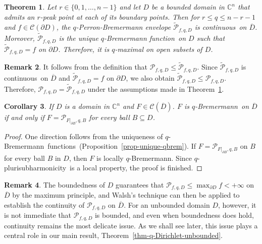 \documentclass[reqno]{amsart}
\newtheorem{thm}{Theorem}[section]
\newtheorem{cor}[thm]{Corollary}
\theoremstyle{definition}
\newtheorem{rem}[thm]{Remark}
\numberwithin{equation}{section}
\newcommand{\cbb}{\mathbb{C}}
\newcommand{\ccal}{\mathcal{C}}
\newcommand{\pcal}{\mathcal{P}}
\newcommand{\qbrem}{$q$-Bremermann}
\newcommand{\qpshy}{$q$-pluri\-sub\-harmonicity}
\newcommand{\cont}{continuous}
\newcommand{\fct}{function}
\newcommand{\fcts}{functions}
\newcommand{\cld}{\overline{D}}
\newcommand{\D}{\displaystyle}
\begin{document}
\begin{thm}\label{thm-q-Dirichlet} Let $r \in \{0,1,\ldots,n-1\}$ and let $D$ be a bounded domain in $\cbb^n$ that admits an $r$-peak point at each of its boundary points. Then for $r \leq q \leq n-r-1$ and $f \in \ccal(\partial D)$, the $q$-Perron-Bremermann envelope $\widetilde{\pcal}_{f,q,D}$ is \cont\ on $\cld$. Moreover, $\widetilde{\pcal}_{f,q,D}$ is the unique $q$-Bremermann \fct\ on $D$ such that $\D \widetilde{\pcal}_{f,q,D} = f$ on $\partial D$. Therefore, it is $q$-maximal on open subsets of $D$.
\end{thm}





\begin{rem} It follows from the definition that $\pcal_{f,q,D} \leq \widetilde{\pcal}_{f,q,D}$. Since $\widetilde{\pcal}_{f,q,D}$ is \cont\ on $\cld$ and $\widetilde{\pcal}_{f,q,D}=f$ on $\partial D$, we also obtain $\widetilde{\pcal}_{f,q,D} \leq \pcal_{f,q,D}$. Therefore, $\pcal_{f,q,D} = \widetilde{\pcal}_{f,q,D}$ under the assumptions made in Theorem~\ref{thm-q-Dirichlet}.
\end{rem}



\begin{cor}\label{prop-equiv-loc-q-max} If $D$ is a domain in $\cbb^n$ and $F \in \ccal(\cld)$. $F$ is \qbrem\ on $\cld$ if and only if $F=\pcal_{F|_{\partial B},q,B}$ for every ball $B \subseteq D$. 
\end{cor}

\begin{proof}
One direction follows from the uniqueness of \qbrem\ \fcts\ (Proposition~\ref{prop-unique-qbrem}). If $F=\pcal_{F|_{\partial B},q,B}$ on $B$ for every ball $B$ in $D$, then $F$ is locally \qbrem. Since \qpshy\ is a local property, the proof is finished.
\end{proof}


\begin{rem} The boundedness of $D$ guarantees that $\pcal_{f,q,D} \leq \max_{\partial D} f < +\infty$ on $\cld$ by the maximum principle, and Walsh's technique \cite{Wa} can then be applied to establish the continuity of $\pcal_{f,q,D}$ on $\cld$. For an unbounded domain $D$, however, it is not immediate that $\pcal_{f,q,D}$ is bounded, and even when boundedness does hold, continuity remains the most delicate issue. As we shall see later, this issue plays a central role in our main result, Theorem~\ref{thm-q-Dirichlet-unbounded}. 
\end{rem}
\end{document}
